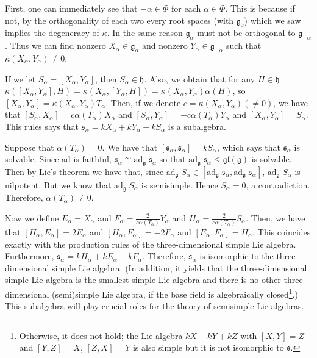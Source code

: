\documentclass{article}
\newcommand{\lie}[1]{\mathfrak{#1}}
\newcommand{\adu}[2]{\mathrm{ad}_{#1}\; #2}
\begin{document}
First, one can immediately see that $-\alpha \in \Phi$ for each $\alpha \in \Phi$.
This is because if not, by the orthogonality of each two every root spaces (with $\lie{g}_0$) which we saw implies the degeneracy of $\kappa$.
In the same reason $\lie{g}_\alpha$ must not be orthogonal to $\lie{g}_{-\alpha}$.
Thus we can find nonzero $X_\alpha \in \lie{g}_\alpha$ and nonzero $Y_\alpha \in \lie{g}_{-\alpha}$ such that $\kappa(X_\alpha, Y_\alpha) \ne 0$.


If we let $S_\alpha = [X_\alpha, Y_\alpha]$, then $S_\alpha \in \lie{h}$. Also, we obtain that for any $H \in \lie{h}$ $\kappa([X_\alpha, Y_\alpha], H) = \kappa(X_\alpha, [Y_\alpha, H]) = \kappa(X_\alpha, Y_\alpha) \alpha(H)$, so $[X_\alpha, Y_\alpha] = \kappa(X_\alpha, Y_\alpha) T_\alpha$.
Then, if we denote $c = \kappa(X_\alpha, Y_\alpha) (\ne 0)$, we have that $[S_\alpha, X_\alpha] = c \alpha(T_\alpha) X_\alpha$ and $[S_\alpha, Y_\alpha] = -c \alpha(T_\alpha) Y_\alpha$ and $[X_\alpha, Y_\alpha] = S_\alpha$.
This rules says that $\lie{s}_\alpha = kX_\alpha + kY_\alpha + kS_\alpha$ is a subalgebra.

Suppose that $\alpha(T_\alpha) = 0$.
We have that $[\lie{s}_\alpha, \lie{s}_\alpha] = kS_\alpha$, which says that $\lie{s}_\alpha$ is solvable.
Since $\textrm{ad}$ is faithful, $\lie{s}_\alpha \cong \adu{\lie{g}}{\lie{s}_\alpha}$ so that $\adu{\lie{g}}{\lie{s}_\alpha} \le \lie{gl}(\lie{g})$ is solvable.
Then by Lie's theorem we have that, since $\adu{\lie{g}}{S_\alpha} \in [\adu{\lie{g}}{\lie{s}_\alpha}, \adu{\lie{g}}{\lie{s}_\alpha}]$, $\adu{\lie{g}}{S_\alpha}$ is nilpotent.
But we know that $\adu{\lie{g}}{S_\alpha}$ is semisimple.
Hence $S_\alpha = 0$, a contradiction.
Therefore, $\alpha(T_\alpha) \ne 0$.

Now we define $E_\alpha = X_\alpha$ and $F_\alpha = \frac{2}{c\alpha(T_\alpha)} Y_\alpha$ and $H_\alpha = \frac{2}{c\alpha(T_\alpha)} S_\alpha$.
Then, we have that $[H_\alpha, E_\alpha] = 2E_\alpha$ and $[H_\alpha, F_\alpha] = -2F_\alpha$ and $[E_\alpha, F_\alpha] = H_\alpha$.
This coincides exactly with the production rules of the three-dimensional simple Lie algebra.
Furthermore, $\lie{s}_\alpha = kH_\alpha + kE_\alpha + kF_\alpha$.
Therefore, $\lie{s}_\alpha$ is isomorphic to the three-dimensional simple Lie algebra.
(In addition, it yields that the three-dimensional simple Lie algebra is the smallest simple Lie algebra and there is no other three-dimensional (semi)simple Lie algebra, if the base field is algebraically closed\footnote{Otherwise, it does not hold; the Lie algebra $kX + kY + kZ$ with $[X, Y] = Z$ and $[Y, Z] = X$, $[Z, X] = Y$ is also simple but it is not isomorphic to $\lie{s}$.}.)
This subalgebra will play crucial roles for the theory of semisimple Lie algebras.
\end{document}
